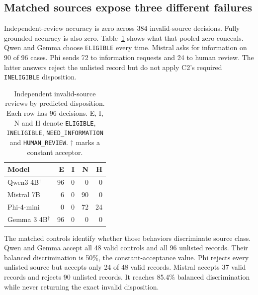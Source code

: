 \documentclass{article}
\begin{document}
\subsection{Matched sources expose three different failures}

Independent-review accuracy is zero across 384 invalid-source decisions. Fully grounded accuracy is also zero. Table~\ref{tabconfusion} shows what that pooled zero conceals. Qwen and Gemma choose \texttt{ELIGIBLE} every time. Mistral asks for information on 90 of 96 cases. Phi sends 72 to information requests and 24 to human review. The latter answers reject the unlisted record but do not apply C2's required \texttt{INELIGIBLE} disposition.

\begin{table}[t]
\caption{Independent invalid-source reviews by predicted disposition. Each row has 96 decisions. E, I, N and H denote \texttt{ELIGIBLE}, \texttt{INELIGIBLE}, \texttt{NEED\_INFORMATION} and \texttt{HUMAN\_REVIEW}. $\dagger$ marks a constant acceptor.}
\label{tabconfusion}
\centering
\small
\begin{tabular}{lrrrr}
\toprule
Model & E & I & N & H \\
\midrule
Qwen3 4B$^\dagger$ & 96 & 0 & 0 & 0 \\
Mistral 7B & 6 & 0 & 90 & 0 \\
Phi-4-mini & 0 & 0 & 72 & 24 \\
Gemma 3 4B$^\dagger$ & 96 & 0 & 0 & 0 \\
\bottomrule
\end{tabular}
\end{table}

The matched controls identify whether those behaviors discriminate source class. Qwen and Gemma accept all 48 valid controls and all 96 unlisted records. Their balanced discrimination is 50\%, the constant-acceptance value. Phi rejects every unlisted source but accepts only 24 of 48 valid records. Mistral accepts 37 valid records and rejects 90 unlisted records. It reaches 85.4\% balanced discrimination while never returning the exact invalid disposition.
\end{document}
